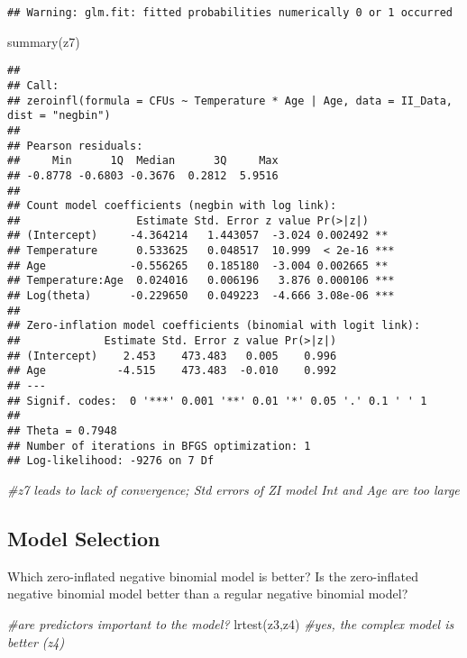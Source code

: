 \documentclass[
]{article}
\newenvironment{Shaded}{\begin{snugshade}}{\end{snugshade}}
\newcommand{\CommentTok}[1]{\textcolor[rgb]{0.56,0.35,0.01}{\textit{#1}}}
\newcommand{\FunctionTok}[1]{\textcolor[rgb]{0.00,0.00,0.00}{#1}}
\newcommand{\NormalTok}[1]{#1}
\begin{document}
\begin{verbatim}
## Warning: glm.fit: fitted probabilities numerically 0 or 1 occurred
\end{verbatim}

\begin{Shaded}
\begin{Highlighting}[]
\FunctionTok{summary}\NormalTok{(z7)}
\end{Highlighting}
\end{Shaded}

\begin{verbatim}
## 
## Call:
## zeroinfl(formula = CFUs ~ Temperature * Age | Age, data = II_Data, dist = "negbin")
## 
## Pearson residuals:
##     Min      1Q  Median      3Q     Max 
## -0.8778 -0.6803 -0.3676  0.2812  5.9516 
## 
## Count model coefficients (negbin with log link):
##                  Estimate Std. Error z value Pr(>|z|)    
## (Intercept)     -4.364214   1.443057  -3.024 0.002492 ** 
## Temperature      0.533625   0.048517  10.999  < 2e-16 ***
## Age             -0.556265   0.185180  -3.004 0.002665 ** 
## Temperature:Age  0.024016   0.006196   3.876 0.000106 ***
## Log(theta)      -0.229650   0.049223  -4.666 3.08e-06 ***
## 
## Zero-inflation model coefficients (binomial with logit link):
##             Estimate Std. Error z value Pr(>|z|)
## (Intercept)    2.453    473.483   0.005    0.996
## Age           -4.515    473.483  -0.010    0.992
## ---
## Signif. codes:  0 '***' 0.001 '**' 0.01 '*' 0.05 '.' 0.1 ' ' 1 
## 
## Theta = 0.7948 
## Number of iterations in BFGS optimization: 1 
## Log-likelihood: -9276 on 7 Df
\end{verbatim}

\begin{Shaded}
\begin{Highlighting}[]
\CommentTok{\#z7 leads to lack of convergence; Std errors of ZI model Int and Age are too large}
\end{Highlighting}
\end{Shaded}

\hypertarget{model-selection}{%
\subsection{Model Selection}\label{model-selection}}

Which zero-inflated negative binomial model is better? Is the
zero-inflated negative binomial model better than a regular negative
binomial model?

\begin{Shaded}
\begin{Highlighting}[]
\CommentTok{\#are predictors important to the model?}
\FunctionTok{lrtest}\NormalTok{(z3,z4) }\CommentTok{\#yes, the complex model is better (z4)}
\end{Highlighting}
\end{Shaded}
\end{document}
